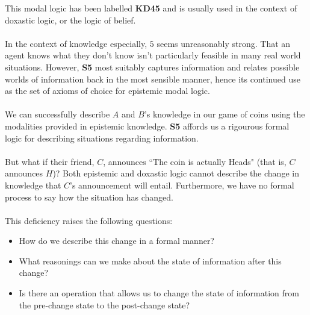 \documentclass[12pt, a4paper, twoside]{article}
\begin{document}
This modal logic has been labelled {\bf KD45} and is usually used in the context
of doxastic logic, or the logic of belief.\\
\\
In the context of knowledge especially, $5$ seems unreasonably strong.
That an agent knows what they don't know isn't particularly feasible in many
real world situations.
However, {\bf S5} most suitably captures information and relates possible
worlds of information back in the most sensible manner, hence its continued use
as the set of axioms of choice for epistemic modal logic.\\
\\
We can successfully describe $A$ and $B$'s knowledge in our game of coins using
the modalities provided in epistemic knowledge.
{\bf S5} affords us a rigourous formal logic for describing situations regarding
information.\\
\\
But what if their friend, $C$, announces ``The coin is actually Heads" (that is,
$C$ announces $H$)?
Both epistemic and doxastic logic cannot describe the change in knowledge that
$C$'s announcement will entail.
Furthermore, we have no formal process to say how the situation has changed.\\
\\
This deficiency raises the following questions:
\begin{itemize}
	\item How do we describe this change in a formal manner?
	\item What reasonings can we make about the state of information after this
	change?
	\item Is there an operation that allows us to change the state of information
	from the pre-change state to the post-change state?
\end{itemize}
\end{document}
